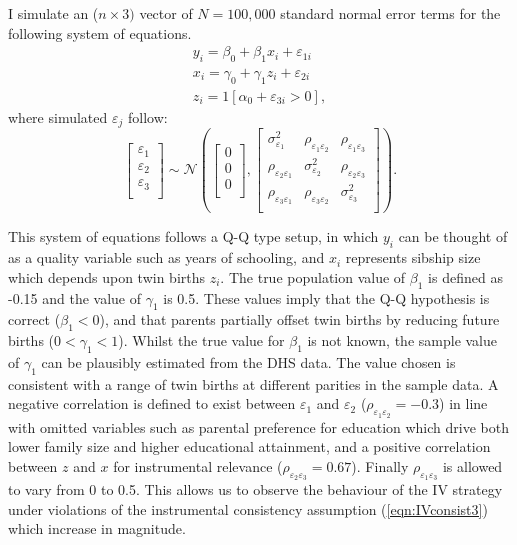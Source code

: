 \documentclass{article}[11pt,subeqn]
\begin{document}
\begin{spacing}{1.5}
I simulate an ($n \times 3)$ vector of $N=100,000$ standard normal error terms for the following system of equations.
\begin{eqnarray}
\label{eqn:MC1}
y_i=\beta_0+\beta_1 x_i + \varepsilon_{1i} \nonumber\\
x_i=\gamma_0 + \gamma_1 z_i + \varepsilon_{2i} \nonumber\\
z_i=1[\alpha_0+\varepsilon_{3i}>0], \nonumber
\end{eqnarray} 
where simulated $\varepsilon_j$ follow:
\begin{equation}
\begin{bmatrix}
\varepsilon_1\\
\varepsilon_2\\
\varepsilon_3\\
\end{bmatrix}
\sim \mathcal{N}
\left(\begin{bmatrix}
0\\
0\\
0\\
\end{bmatrix}
,
\begin{bmatrix}
\sigma_{\varepsilon_1}^2 &  \rho_{\varepsilon_1\varepsilon_2} &  \rho_{\varepsilon_1\varepsilon_3}\\
\rho_{\varepsilon_2\varepsilon_1} & \sigma_{\varepsilon_2}^2 &  \rho_{\varepsilon_2\varepsilon_3} \\
\rho_{\varepsilon_3\varepsilon_1}&  \rho_{\varepsilon_3\varepsilon_2}& \sigma_{\varepsilon_3}^2 \\
\end{bmatrix}\right).
\end{equation}

This system of equations follows a Q-Q type setup, in which $y_i$ can be thought of as a quality variable such as years of schooling, and $x_i$ represents
sibship size which depends upon twin births $z_i$. The true population value of $\beta_1$ is defined as -0.15 and the value of $\gamma_1$ is 0.5.  These
values imply that the Q-Q hypothesis is correct ($\beta_1<0$), and that parents partially offset twin births by reducing future births ($0<\gamma_1<1$).
Whilst the true value for $\beta_1$ is not known, the sample value of $\gamma_1$ can be plausibly estimated from the DHS data.  The  value chosen is consistent
with a range of twin births at different parities in the sample data.
A negative correlation is defined to exist between $\varepsilon_1$ and $\varepsilon_2$ ($\rho_{\varepsilon_1\varepsilon_2}=-0.3$) in line with omitted variables such as
parental preference for education which drive both lower family size and higher educational attainment, and a positive correlation between $z$ and $x$ for
instrumental relevance ($\rho_{\varepsilon_2\varepsilon_3}=0.67$). Finally $\rho_{\varepsilon_1\varepsilon_3}$ is allowed to vary from 0 to 0.5.  This allows
us to observe the behaviour of the IV strategy under violations of the instrumental consistency assumption (\ref{eqn:IVconsist3}) which increase in magnitude.


\end{spacing}
\end{document}
